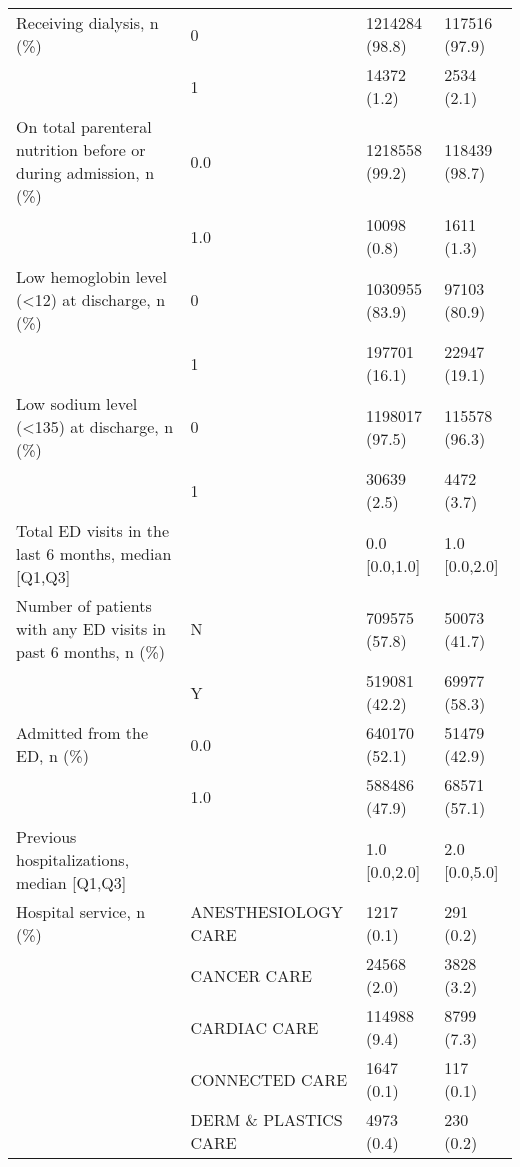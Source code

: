 \begin{tabular}{llll}
Receiving dialysis, n (\%) & 0 &          1214284 (98.8) &     117516 (97.9) \\
                                       & 1 &             14372 (1.2) &        2534 (2.1) \\
On total parenteral nutrition before or during admission, n (\%) & 0.0 &          1218558 (99.2) &     118439 (98.7) \\
                                       & 1.0 &             10098 (0.8) &        1611 (1.3) \\
Low hemoglobin level (<12) at discharge, n (\%) & 0 &          1030955 (83.9) &      97103 (80.9) \\
                                       & 1 &           197701 (16.1) &      22947 (19.1) \\
Low sodium level (<135) at discharge, n (\%) & 0 &          1198017 (97.5) &     115578 (96.3) \\
                                       & 1 &             30639 (2.5) &        4472 (3.7) \\
Total ED visits in the last 6 months, median [Q1,Q3] &   &           0.0 [0.0,1.0] &     1.0 [0.0,2.0] \\
Number of patients with any ED visits in past 6 months, n (\%) & N &           709575 (57.8) &      50073 (41.7) \\
                                       & Y &           519081 (42.2) &      69977 (58.3) \\
Admitted from the ED, n (\%) & 0.0 &           640170 (52.1) &      51479 (42.9) \\
                                       & 1.0 &           588486 (47.9) &      68571 (57.1) \\
Previous hospitalizations, median [Q1,Q3] &   &           1.0 [0.0,2.0] &     2.0 [0.0,5.0] \\
Hospital service, n (\%) & ANESTHESIOLOGY CARE &              1217 (0.1) &         291 (0.2) \\
                                       & CANCER CARE &             24568 (2.0) &        3828 (3.2) \\
                                       & CARDIAC CARE &            114988 (9.4) &        8799 (7.3) \\
                                       & CONNECTED CARE &              1647 (0.1) &         117 (0.1) \\
                                       & DERM \& PLASTICS CARE &              4973 (0.4) &         230 (0.2) \\

\end{tabular}
